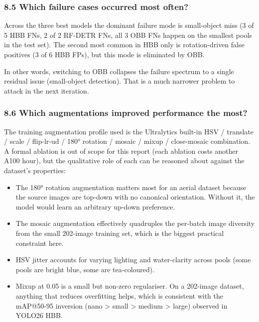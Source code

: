 \documentclass[11pt
]{article}
\providecommand{\tightlist}{%
  \setlength{\itemsep}{0pt}\setlength{\parskip}{0pt}}
\begin{document}
\subsubsection{8.5 Which failure cases occurred most
often?}\label{which-failure-cases-occurred-most-often}

Across the three best models the dominant failure mode is small-object
miss (3 of 5 HBB FNs, 2 of 2 RF-DETR FNs, all 3 OBB FNs happen on the
smallest pools in the test set). The second most common in HBB only is
rotation-driven false positives (3 of 6 HBB FPs), but this mode is
eliminated by OBB.

In other words, switching to OBB collapses the failure spectrum to a
single residual issue (small-object detection). That is a much narrower
problem to attack in the next iteration.

\subsubsection{8.6 Which augmentations improved performance the
most?}\label{which-augmentations-improved-performance-the-most}

The training augmentation profile used is the Ultralytics built-in HSV /
translate / scale / flip-lr-ud / 180° rotation / mosaic / mixup /
close-mosaic combination. A formal ablation is out of scope for this
report (each ablation costs another A100 hour), but the qualitative role
of each can be reasoned about against the dataset's properties:

\begin{itemize}
\tightlist
\item
  The 180° rotation augmentation matters most for an aerial dataset
  because the source images are top-down with no canonical orientation.
  Without it, the model would learn an arbitrary up-down preference.
\item
  The mosaic augmentation effectively quadruples the per-batch image
  diversity from the small 202-image training set, which is the biggest
  practical constraint here.
\item
  HSV jitter accounts for varying lighting and water-clarity across
  pools (some pools are bright blue, some are tea-coloured).
\item
  Mixup at 0.05 is a small but non-zero regulariser. On a 202-image
  dataset, anything that reduces overfitting helps, which is consistent
  with the mAP@50-95 inversion (nano \textgreater{} small \textgreater{}
  medium \textgreater{} large) observed in YOLO26 HBB.
\end{itemize}
\end{document}
